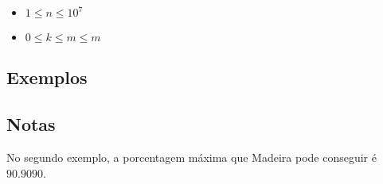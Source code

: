 \begin{itemize}
  \item $1 \leq n \leq 10^7$
  \item $0 \leq k \leq m \leq m$
\end{itemize}

\subsection*{Exemplos}

\begin{center}
\end{center}

\subsection*{Notas}

No segundo exemplo, a porcentagem máxima que Madeira pode conseguir é $90.9090$.
